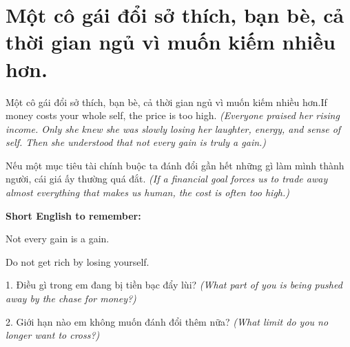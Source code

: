 \section{Một cô gái đổi sở thích, bạn bè, cả thời gian ngủ vì muốn kiếm nhiều hơn.}
\begin{truyen}{Một cô gái đổi sở thích, bạn bè, cả thời gian ngủ vì muốn kiếm nhiều hơn.}{If money costs your whole self, the price is too high.}
\textit{(Everyone praised her rising income. Only she knew she was slowly losing her laughter, energy, and sense of self. Then she understood that not every gain is truly a gain.)}
\end{truyen}
\begin{baihoc}
Nếu một mục tiêu tài chính buộc ta đánh đổi gần hết những gì làm mình thành người, cái giá ấy thường quá đắt.
\textit{(If a financial goal forces us to trade away almost everything that makes us human, the cost is often too high.)}
\end{baihoc}
\begin{ghinhoanh}
\textbf{Short English to remember:}

Not every gain is a gain.

Do not get rich by losing yourself.
\end{ghinhoanh}
\begin{tuhocnhanh}
1. Điều gì trong em đang bị tiền bạc đẩy lùi? \textit{(What part of you is being pushed away by the chase for money?)}

2. Giới hạn nào em không muốn đánh đổi thêm nữa? \textit{(What limit do you no longer want to cross?)}
\end{tuhocnhanh}
\ngancach